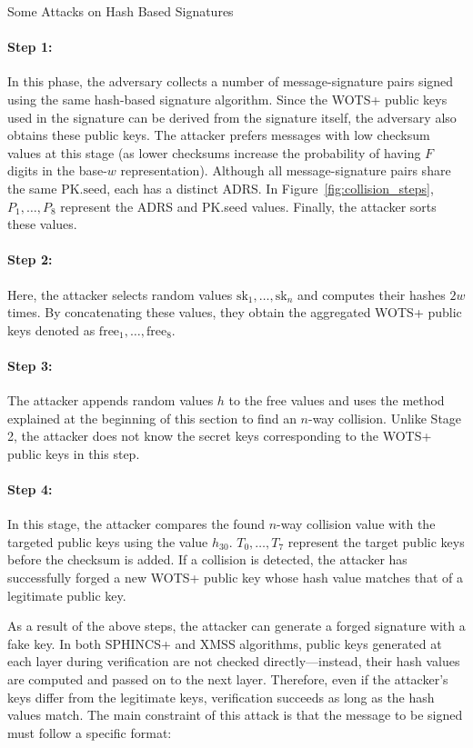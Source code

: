 \begin{section}{Some Attacks on Hash Based Signatures}
\paragraph{Step 1:}
In this phase, the adversary collects a number of message-signature pairs signed using the same hash-based signature algorithm. Since the WOTS+ public keys used in the signature can be derived from the signature itself, the adversary also obtains these public keys. The attacker prefers messages with low checksum values at this stage (as lower checksums increase the probability of having \( F \) digits in the base-\( w \) representation). Although all message-signature pairs share the same \( \text{PK.seed} \), each has a distinct ADRS. In Figure~\ref{fig:collision_steps}, \( P_1, \ldots, P_8 \) represent the ADRS and PK.seed values. Finally, the attacker sorts these values.

\paragraph{Step 2:}
Here, the attacker selects random values \( \text{sk}_1, \ldots, \text{sk}_n \) and computes their hashes \( 2w \) times. By concatenating these values, they obtain the aggregated WOTS+ public keys denoted as \( \text{free}_1, \ldots, \text{free}_8 \).

\paragraph{Step 3:}
The attacker appends random values \( h \) to the free values and uses the method explained at the beginning of this section to find an \( n \)-way collision. Unlike Stage 2, the attacker does not know the secret keys corresponding to the WOTS+ public keys in this step.

\paragraph{Step 4:}
In this stage, the attacker compares the found \( n \)-way collision value with the targeted public keys using the value \( h_{30} \). \( T_0, \ldots, T_7 \) represent the target public keys before the checksum is added. If a collision is detected, the attacker has successfully forged a new WOTS+ public key whose hash value matches that of a legitimate public key.

As a result of the above steps, the attacker can generate a forged signature with a fake key. In both SPHINCS+ and XMSS algorithms, public keys generated at each layer during verification are not checked directly—instead, their hash values are computed and passed on to the next layer. Therefore, even if the attacker’s keys differ from the legitimate keys, verification succeeds as long as the hash values match. The main constraint of this attack is that the message to be signed must follow a specific format:


\end{section}
